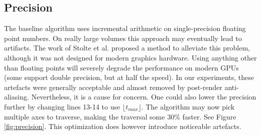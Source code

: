 \subsection{Precision}
The baseline algorithm uses incremental arithmetic on single-precision floating point numbers. On really large volumes this approach may eventually lead to artifacts. The work of Stolte et al. \cite{stolte95} proposed a method to alleviate this problem, although it was not designed for modern graphics hardware. Using anything other than floating points will severely degrade the performance on modern GPUs (some support double precision, but at half the speed). In our experiments, these artefacts were generally acceptable and almost removed by post-render anti-aliasing. Nevertheless, it is a cause for concern. One could also lower the precision further by changing lines 13-14 to use $\lfloor t_{max} \rfloor$. The algorithm may now pick multiple axes to traverse, making the traversal some 30\% faster. See Figure \ref{fig:precision}. This optimization does however introduce noticeable artefacts.

